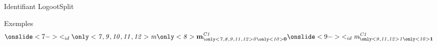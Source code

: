 \begin{frame}{Identifiant LogootSplit}
{\begin{block}{Exemples}
\begin{equation*}
                \onslide<7->{
                    \lid \id{
                        \only<7,9,10,11,12>{m}
                        \only<8>{\mathbf{m}}
                    }{C1}{
                        \only<7,8,9,11,12>{0}
                        \only<10>{\textbf{0}}
                    }
                }
                \onslide<9->{
                    \lid \id{m}{C1}{
                        \only<9,11,12>{1}
                        \only<10>{\textbf{1}}
                        }
                }
            \end{equation*}
        \end{block}
    }
\end{frame}


